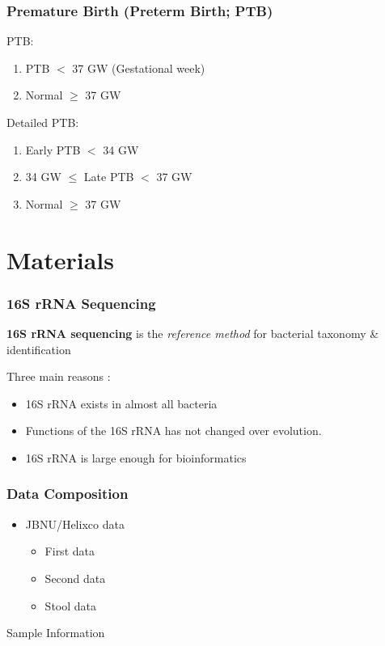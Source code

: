 \documentclass{beamer}
\begin{document}
    \begin{frame}
        \frametitle{Premature Birth (Preterm Birth; PTB)}

        PTB:
        \begin{enumerate}
            \item PTB $<$ 37 GW (Gestational week)
            \item Normal $\ge$ 37 GW
        \end{enumerate}

        Detailed PTB:
        \begin{enumerate}
            \item Early PTB $<$ 34 GW
            \item 34 GW $\le$ Late PTB $<$ 37 GW
            \item Normal $\ge$ 37 GW
        \end{enumerate}

        \cite{premature1, premature2}
    \end{frame}

    \section{Materials}
    \begin{frame}
        \frametitle{16S rRNA Sequencing}

        \textbf{16S rRNA sequencing} is the \textit{reference method} for bacterial taxonomy \& identification \cite{16S1}

        Three main reasons \cite{16S2}:
        \begin{itemize}
            \item 16S rRNA exists in almost all bacteria
            \item Functions of the 16S rRNA has not changed over evolution.
            \item 16S rRNA is large enough for bioinformatics
        \end{itemize}
    \end{frame}

    \begin{frame}
        \frametitle{Data Composition}
        \begin{itemize}
            \item JBNU/Helixco data
            \begin{itemize}
                \item First data
                \item Second data
                \item Stool data
            \end{itemize}
        \end{itemize}

        \begin{table}
            \centering
            \caption{Sample Information}
            
        \end{table}
    \end{frame}
\end{document}
